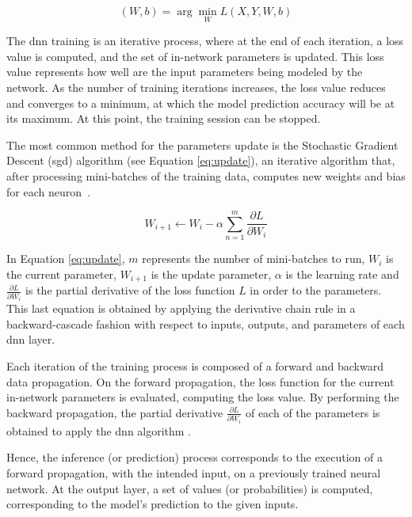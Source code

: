 \begin{equation}
    \label{eq:loss}
    (W,b) = \arg\min_{W} L(X,Y,W,b)
\end{equation}

The \acrshort{dnn} training is an iterative process, where at the end of each iteration, a loss value is computed, and the set of in-network parameters is updated. This loss value represents how well are the input parameters being modeled by the network. As the number of training iterations increases, the loss value reduces and converges to a minimum, at which the model prediction accuracy will be at its maximum. At this point, the training session can be stopped.

The most common method for the parameters update is the Stochastic Gradient Descent (\acrshort{sgd}) algorithm (see Equation \ref{eq:update}), an iterative algorithm that, after processing mini-batches of the training data, computes new weights and bias for each neuron~\cite{ruder_overview_2017}. 

\begin{equation}
    \label{eq:update}
    W_{i+1} \xleftarrow{} W_i - \alpha \sum_{n=1}^{m}\frac{\partial L}{\partial W_i}
\end{equation}

In Equation \ref{eq:update}, $m$ represents the number of mini-batches to run, $W_i$ is the current parameter, $W_{i+1}$ is the update parameter, $\alpha$ is the learning rate and $\frac{\partial L}{\partial W_i}$ is the partial derivative of the loss function $L$ in order to the parameters. This last equation is obtained by applying the derivative chain rule in a backward-cascade fashion with respect to inputs, outputs, and parameters of each \acrshort{dnn} layer.

Each iteration of the training process is composed of a forward and backward data propagation. On the forward propagation, the loss function for the current in-network parameters is evaluated, computing the loss value. By performing the backward propagation, the partial derivative $\frac{\partial L}{\partial W_i}$ of each of the parameters is obtained to apply the \acrshort{dnn} algorithm . 

Hence, the inference (or prediction) process corresponds to the execution of a forward propagation, with the intended input, on a previously trained neural network. At the output layer, a set of values (or probabilities) is computed, corresponding to the model's prediction to the given inputs.

